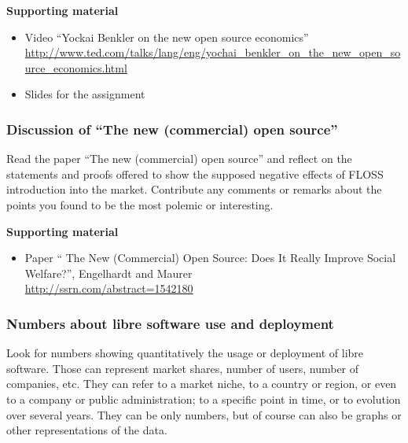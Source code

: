 \documentclass[a4paper]{article}
\begin{document}
\textbf{Supporting material}

\begin{itemize}
\item Video ``Yockai Benkler on the new open source economics'' \\
  \url{http://www.ted.com/talks/lang/eng/yochai_benkler_on_the_new_open_source_economics.html}
\item Slides for the assignment 
\end{itemize}

\subsubsection{Discussion of ``The new (commercial) open source''}
\label{sub:new-oss}

Read the paper ``The new (commercial) open source'' and reflect on the statements and proofs offered to show the supposed negative effects of FLOSS introduction into the market. Contribute any comments or remarks about the points you found to be the most polemic or interesting.

\textbf{Supporting material}

\begin{itemize}
\item Paper `` The New (Commercial) Open Source: Does It Really Improve Social Welfare?'', Engelhardt and Maurer \\
  \url{http://ssrn.com/abstract=1542180}
\end{itemize}

\subsubsection{Numbers about libre software use and deployment}
\label{sub:numbers-use}

Look for numbers showing quantitatively the usage or deployment of libre software. Those can represent market shares, number of users, number of companies, etc. They can refer to a market niche, to a country or region, or even to a company or public administration; to a specific point in time, or to evolution over several years. They can be only numbers, but of course can also be graphs or other representations of the data.

\end{document}
